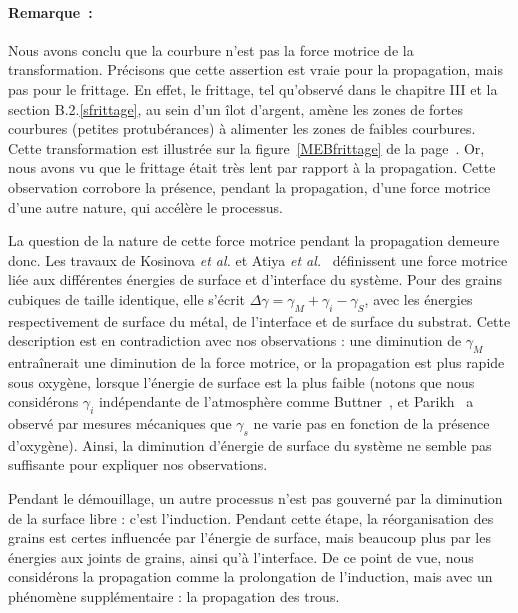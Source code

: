 \paragraph*{Remarque~:} Nous avons conclu que la courbure n'est pas la force motrice de la transformation. Précisons que cette assertion est vraie pour la propagation, mais pas pour le frittage. En effet, le frittage, tel qu'observé dans le chapitre III et la section B.2.\ref{sfrittage}, au sein d'un îlot d'argent, amène les zones de fortes courbures (petites protubérances) à alimenter les zones de faibles courbures. Cette transformation est illustrée sur la figure~\ref{MEBfrittage} de la page~\pageref{MEBfrittage}. Or, nous avons vu que le frittage était très lent par rapport à la propagation. Cette observation corrobore la présence, pendant la propagation, d'une force motrice d'une autre nature, qui accélère le processus.\par \vspace{12pt}

La question de la nature de cette force motrice pendant la propagation demeure donc. Les travaux de Kosinova \textit{et al.} et Atiya \textit{et al.}~\cite{kosinova2014role, atiya2014role} définissent une force motrice liée aux différentes énergies de surface et d'interface du système. Pour des grains cubiques de taille identique, elle s'écrit $\Delta\gamma = \gamma_M+\gamma_i-\gamma_S$, avec les énergies respectivement de surface du métal, de l'interface et de surface du substrat. Cette description est en contradiction avec nos observations : une diminution de $\gamma_M$ entraînerait une diminution de la force motrice, or la propagation est plus rapide sous oxygène, lorsque l'énergie de surface est la plus faible (notons que nous considérons $\gamma_i$ indépendante de l'atmosphère comme Buttner~\cite{buttner1952adsorption}, et Parikh~\cite{parikh1958effect} a observé par mesures mécaniques que $\gamma_s$ ne varie pas en fonction de la présence d'oxygène). Ainsi, la diminution d'énergie de surface du système ne semble pas suffisante pour expliquer nos observations.\par 
Pendant le démouillage, un autre processus n'est pas gouverné par la diminution de la surface libre : c'est l'induction. Pendant cette étape, la réorganisation des grains est certes influencée par l'énergie de surface, mais beaucoup plus par les énergies aux joints de grains, ainsi qu'à l'interface. De ce point de vue, nous considérons la propagation comme la prolongation de l'induction, mais avec un phénomène supplémentaire : la propagation des trous.\par 
{}

